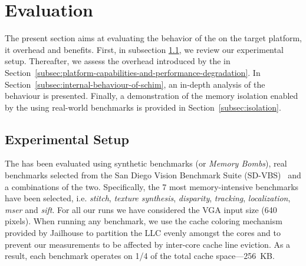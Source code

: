 \section{Evaluation}

The present section aims at evaluating the behavior of the \schim on
the target platform, it overhead and benefits.  First, in subsection
\ref{subsection:considered-architecture}, we review our experimental
setup. Thereafter, we assess the overhead introduced by the \schim in
Section~\ref{subsec:platform-capabilities-and-performance-degradation}. In
Section~\ref{subsec:internal-behaviour-of-schim}, an in-depth analysis
of the \schim behaviour is presented. Finally, a demonstration of the
memory isolation enabled by the \schim using real-world benchmarks is
provided in Section~\ref{subsec:isolation}.
  

\subsection{Experimental Setup}
\label{subsection:considered-architecture}
The \schim has been evaluated using synthetic benchmarks (or
\emph{Memory Bombs}), real benchmarks selected from the San Diego
Vision Benchmark Suite (SD-VBS)~\cite{SD-VBS} and a combinations of
the two. Specifically, the 7 most memory-intensive benchmarks have
been selected, i.e. \emph{stitch}, \emph{texture synthesis},
\emph{disparity}, \emph{tracking}, \emph{localization}, \emph{mser}
and \emph{sift}. For all our runs we have considered the VGA input
size (640 pixels). When running any benchmark, we use the
cache coloring mechanism provided by Jailhouse to partition the LLC
evenly amongst the cores and to prevent our measurements to be
affected by inter-core cache line eviction. As a result, each
benchmark operates on 1/4 of the total cache space---256~KB.


